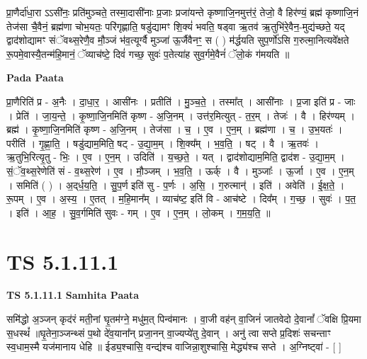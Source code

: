\documentclass[17pt]{extarticle}
\begin{document}
प्रा॒णैर्दा॑धा॒रा ऽऽसी॑नः॒ प्रति॑मुञ्चते॒ तस्मा॒दासी॑नाः प्र॒जाः प्रजा॑यन्ते कृष्णाजि॒नमुत्त॑रं॒ तेजो॒ वै हिर॑ण्यं॒ ब्रह्म॑ कृष्णाजि॒नं तेज॑सा चै॒वैनं॒ ब्रह्म॑णा चोभ॒यतः॒ परि॑गृह्णाति॒ षडु॑द्यामꣳ शि॒क्यं॑ भवति॒ षड्वा ऋ॒तव॑ ऋ॒तुभि॑रे॒वैन॒-मुद्य॑च्छते॒ यद् द्वाद॑शोद्यामꣳ संॅवथ्स॒रेणै॒व मौ॒ञ्जं भ॑व॒त्यूर्ग्वै मुञ्जा॑ ऊ॒र्जैवैनꣳ॒॒ स ( ) म॑र्द्धयति सुप॒र्णो॑ऽसि ग॒रुत्मा॒नित्यवे᳚क्षते रू॒पमे॒वास्यै॒तन्म॑हि॒मानं॒ ॅव्याच॑ष्टे॒ दिवं॑ गच्छ॒ सुवः॑ प॒तेत्या॑ह सुव॒र्गमे॒वैनं॑ ॅलो॒कं ग॑मयति ॥ \newline

\textbf{Pada Paata} \newline

प्रा॒णैरिति॑ प्र - अ॒नैः । दा॒धा॒र॒ । आसी॑नः । प्रतीति॑ । मु॒ञ्च॒ते॒ । तस्मा᳚त् । आसी॑नाः । प्र॒जा इति॑ प्र - जाः । प्रेति॑ । जा॒य॒न्ते॒ । कृ॒ष्णा॒जि॒नमिति॑ कृष्ण - अ॒जि॒नम् । उत्त॑र॒मित्युत् - त॒र॒म् । तेजः॑ । वै । हिर॑ण्यम् । ब्रह्म॑ । कृ॒ष्णा॒जि॒नमिति॑ कृष्ण - अ॒जि॒नम् । तेज॑सा । च॒ । ए॒व । ए॒न॒म् । ब्रह्म॑णा । च॒ । उ॒भ॒यतः॑ । परीति॑ । गृ॒ह्णा॒ति॒ । षडु॑द्याम॒मिति॒ षट् - उ॒द्या॒म॒म् । शि॒क्य᳚म् । भ॒व॒ति॒ । षट् । वै । ऋ॒तवः॑ । ऋ॒तुभि॒रित्यृ॒तु - भिः॒ । ए॒व । ए॒न॒म् । उदिति॑ । य॒च्छ॒ते॒ । यत् । द्वाद॑शोद्याम॒मिति॒ द्वाद॑श - उ॒द्या॒म॒म् । सं॒ॅव॒थ्स॒रेणेति॑ सं - व॒थ्स॒रेण॑ । ए॒व । मौ॒ञ्जम् । भ॒व॒ति॒ । ऊर्क् । वै । मुञ्जाः᳚ । ऊ॒र्जा । ए॒व । ए॒न॒म् । समिति॑ ( ) । अ॒द्‌र्ध॒य॒ति॒ । सु॒प॒र्ण इति॑ सु - प॒र्णः । अ॒सि॒ । ग॒रुत्मान्॑ । इति॑ । अवेति॑ । ई॒क्ष॒ते॒ । रू॒पम् । ए॒व । अ॒स्य॒ । ए॒तत् । म॒हि॒मान᳚म् । व्याच॑ष्ट॒ इति॑ वि - आच॑ष्टे । दिव᳚म् । ग॒च्छ॒ । सुवः॑ । प॒त॒ । इति॑ । आ॒ह॒ । सु॒व॒र्गमिति॑ सुवः - गम् । ए॒व । ए॒न॒म् । लो॒कम् । ग॒म॒य॒ति॒ ॥  \newline





\section{ TS 5.1.11.1 }

\textbf{TS 5.1.11.1 } \newline
\textbf{Samhita Paata} \newline

समि॑द्धो अ॒ञ्जन् कृद॑रं मती॒नां घृ॒तम॑ग्ने॒ मधु॑म॒त् पिन्व॑मानः । वा॒जी वह॑न् वा॒जिनं॑ जातवेदो दे॒वानां᳚ ॅवक्षि प्रि॒यमा स॒धस्थं᳚ ॥घृ॒तेना॒ञ्जन्थ्सं प॒थो दे॑व॒याना᳚न् प्रजा॒नन् वा॒ज्यप्ये॑तु दे॒वान् । अनु॑ त्वा सप्ते प्र॒दिशः॑ सचन्ताꣳ स्व॒धाम॒स्मै यज॑मानाय धेहि ॥ ईड्य॒श्चासि॒ वन्द्य॑श्च वाजिन्ना॒शुश्चासि॒ मेद्ध्य॑श्च सप्ते । अ॒ग्निष्ट्वा॑ - [  ] \newline
\end{document}

